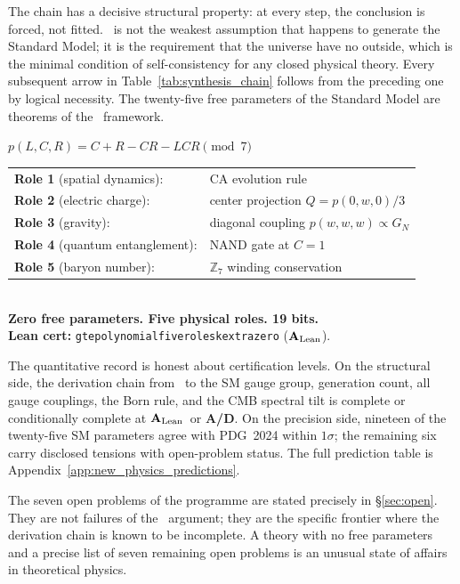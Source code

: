 \documentclass[11pt,openany]{book}
\theoremstyle{remark}
\newcommand{\GTE}{\text{GTE}}
\newcommand{\PSC}{\text{PSC}}
\newcommand{\ZS}{\mathbb{Z}_7}
\newcommand{\lean}[1]{%
  \penalty-100
  \begingroup\def\_{\textunderscore\allowbreak}\texttt{#1}\endgroup}
\newcommand{\CatAL}{\ensuremath{\textbf{A}_{\rm Lean}}}
\newcommand{\CatAD}{\textbf{A/D}}
\begin{document}
The chain has a decisive structural property: at every step, the conclusion is
forced, not fitted. \PSC\ is not the weakest assumption that happens to generate
the Standard Model; it is the requirement that the universe have no outside, which
is the minimal condition of self-consistency for any closed physical theory. Every
subsequent arrow in Table~\ref{tab:synthesis_chain} follows from the preceding one
by logical necessity. The twenty-five free parameters of the Standard Model are
theorems of the \GTE\ framework.

\begin{tcolorbox}[colback=orange!5,colframe=orange!60,title={The 19-Bit Universe (\CatAL)}]
\centering
$p(L,C,R) = C + R - CR - LCR \pmod{7}$\\[0.5em]
\begin{tabular}{ll}
\textbf{Role 1} (spatial dynamics): & CA evolution rule \\
\textbf{Role 2} (electric charge):  & center projection $Q = p(0,w,0)/3$ \\
\textbf{Role 3} (gravity):          & diagonal coupling $p(w,w,w) \propto G_N$ \\
\textbf{Role 4} (quantum entanglement): & NAND gate at $C=1$ \\
\textbf{Role 5} (baryon number):    & $\ZS$ winding conservation \\
\end{tabular}\\[0.5em]
\textbf{Zero free parameters. Five physical roles. 19 bits.}\\
\textbf{Lean cert:} \lean{gte\_polynomial\_five\_roles\_k\_extra\_zero} (\CatAL).
\end{tcolorbox}

The quantitative record is honest about certification levels. On the structural
side, the derivation chain from \PSC\ to the SM gauge group, generation count,
all gauge couplings, the Born rule, and the CMB spectral tilt is complete or
conditionally complete at \CatAL\ or \CatAD. On the precision side, nineteen
of the twenty-five SM parameters agree with PDG~2024 within $1\sigma$; the
remaining six carry disclosed tensions with open-problem status. The full
prediction table is Appendix~\ref{app:new_physics_predictions}.

The seven open problems of the programme are stated precisely in \S\ref{sec:open}.
They are not failures of the \GTE\ argument; they are the specific frontier where
the derivation chain is known to be incomplete. A theory with no free parameters
and a precise list of seven remaining open problems is an unusual state of affairs
in theoretical physics.
\end{document}
